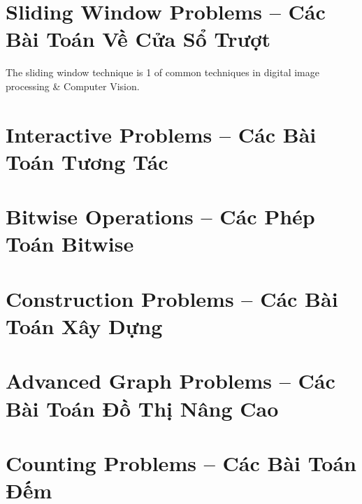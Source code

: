 \documentclass{article}
\begin{document}

\section{Sliding Window Problems -- Các Bài Toán Về Cửa Sổ Trượt}
The sliding window technique is 1 of common techniques in digital image processing \& Computer Vision.


\section{Interactive Problems -- Các Bài Toán Tương Tác}


\section{Bitwise Operations -- Các Phép Toán Bitwise}


\section{Construction Problems -- Các Bài Toán Xây Dựng}


\section{Advanced Graph Problems -- Các Bài Toán Đồ Thị Nâng Cao}


\section{Counting Problems -- Các Bài Toán Đếm}


\end{document}
